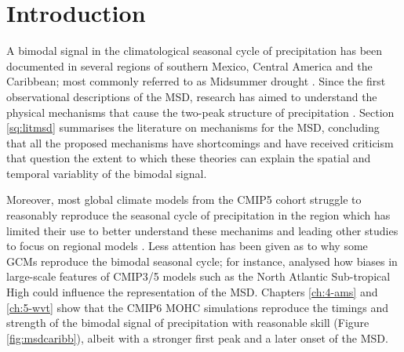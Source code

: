 
\section{Introduction}

A bimodal signal in the climatological seasonal cycle of precipitation has been documented in several regions of southern Mexico, Central America and the Caribbean; most commonly referred to as Midsummer drought  \citep[MSD][]{mosino1966,magana1999,gamble2008,perdigon2018,zhao2020}.  
Since the first observational descriptions of the MSD, research has aimed to understand the physical mechanisms that cause the two-peak structure of precipitation  \citep[e.g.][]{hastenrath1967,magana1999,curtis2002,herrera2015,maldonado2017,straffon2019,perdigon2019,zermeno2019}. 
Section \ref{sq:litmsd} summarises the literature on mechanisms for the MSD, concluding that all the proposed mechanisms have shortcomings and have received criticism that question the extent to which these theories can explain the spatial and temporal variablity of the bimodal signal.

Moreover, most global climate models from the CMIP5 cohort struggle to reasonably reproduce the seasonal cycle of precipitation in the region \citep{rauscher2008,ryu2014} which has limited their use to better understand these mechanims and leading other studies to focus on regional models \citep{fuentes2015inter,cavazos2020}.  
Less attention has been given as to why some GCMs reproduce the bimodal seasonal cycle; for instance, \cite{ryu2014} analysed how biases in large-scale features of CMIP3/5 models such as the North Atlantic Sub-tropical High could influence the representation of the MSD.  
 Chapters \ref{ch:4-ams} and \ref{ch:5-wvt} show that the CMIP6 MOHC simulations reproduce the timings and strength of the bimodal signal of precipitation with reasonable skill (Figure \ref{fig:msdcaribb}), albeit with a stronger first peak and a later onset of the MSD. 

